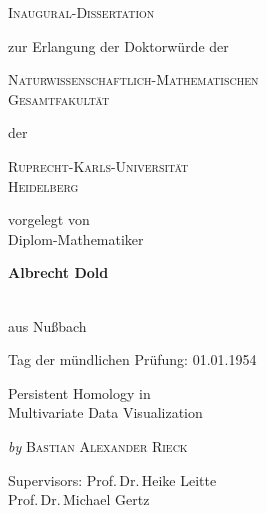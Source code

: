 
\begin{titlepage}
	\begin{center}
		\textsc{\huge Inaugural-Dissertation}
                \vskip 1cm
                \begin{large}
                  zur Erlangung der Doktorwürde der\\[0.50cm]
                  \begin{Large}
                    \textsc{Naturwissenschaftlich-Mathematischen\\Gesamtfakultät}\\[0.50cm]
                  \end{Large}
                  der\\[0.50cm]
                  \begin{Large}
                    \textsc{Ruprecht-Karls-Universität\\Heidelberg}\par
                  \end{Large}
                \end{large}
		\vfill
		\begin{large}
                  vorgelegt von\\
                  Diplom-Mathematiker\\[0.5cm]
                  \begin{LARGE}
                    \textbf{Albrecht Dold}
                  \end{LARGE}\\[0.5cm]
                  aus Nu{\ss}bach
		\end{large}
    \vskip 1cm
    \begin{small}
      Tag der mündlichen Prüfung: 01.01.1954
    \end{small}
	\end{center}
\end{titlepage}


\begin{titlepage}
  \phantom{}
  \vfill 
  \begin{center}
    \begin{singlespace*}
      \begin{Huge}
          Persistent Homology in\\
          Multivariate Data Visualization\par
      \end{Huge}
      \vskip 0.25cm
      \emph{by}
      \vskip 0.25cm
      \textsc{Bastian Alexander Rieck}\par
    \end{singlespace*}
  \end{center}
  \vfill
  \begin{singlespace*}
    Supervisors:            Prof.\,Dr.\,Heike Leitte\\
    \phantom{Supervisors:}  Prof.\,Dr.\,Michael Gertz
  \end{singlespace*}
\end{titlepage}

\newpage
\null
\thispagestyle{empty}
\newpage
